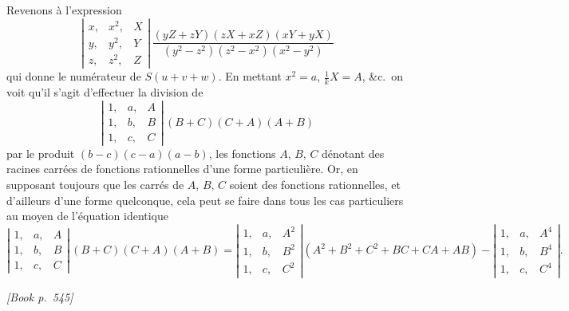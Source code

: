 \documentclass[11pt]{article}
\begin{document}
Revenons \`a l'expression
\[
\left|\begin{array}{ccc}x, & x^{2}, & X\\ y, & y^{2}, & Y\\ z, & z^{2}, & Z\end{array}\right|\,\dfrac{(yZ + zY)(zX + xZ)(xY + yX)}{(y^{2} - z^{2})(z^{2} - x^{2})(x^{2} - y^{2})}
\]
qui donne le num\'erateur de $S(u + v + w)$. En mettant $x^{2} = a$, $\tfrac{1}{k}X = A$, \&c.\ on voit qu'il s'agit d'effectuer la division de
\[
\left|\begin{array}{ccc}1, & a, & A\\ 1, & b, & B\\ 1, & c, & C\end{array}\right|\,(B + C)(C + A)(A + B)
\]
par le produit $(b - c)(c - a)(a - b)$, les fonctions $A$, $B$, $C$ d\'enotant des racines carr\'ees de fonctions rationnelles d'une forme particuli\`ere. Or, en supposant toujours que les carr\'es de $A$, $B$, $C$ soient des fonctions rationnelles, et d'ailleurs d'une forme quelconque, cela peut se faire dans tous les cas particuliers au moyen de l'\'equation identique
\[
\left|\begin{array}{ccc}1, & a, & A\\ 1, & b, & B\\ 1, & c, & C\end{array}\right|\,(B + C)(C + A)(A + B) = \left|\begin{array}{ccc}1, & a, & A^{2}\\ 1, & b, & B^{2}\\ 1, & c, & C^{2}\end{array}\right|(A^{2} + B^{2} + C^{2} + BC + CA + AB) - \left|\begin{array}{ccc}1, & a, & A^{4}\\ 1, & b, & B^{4}\\ 1, & c, & C^{4}\end{array}\right|.
\]

\medskip
\noindent\textit{[Book p.~545]}\hfill

\smallskip
\end{document}
